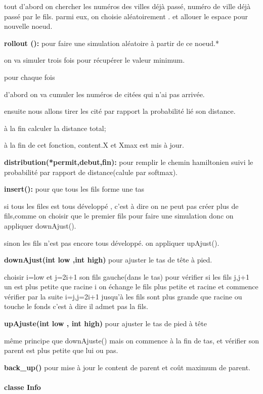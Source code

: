 \documentclass[]{article}
\let\oldparagraph\paragraph
\renewcommand{\paragraph}[1]{\oldparagraph{#1}\mbox{}}
\begin{document}
tout d'abord on chercher les numéros des villes déjà passé, numéro de
ville déjà passé par le fils. parmi eux, on choisie aléatoirement . et
allouer le espace pour nouvelle noeud.

\textbf{rollout (): }pour faire une simulation aléatoire à partir de ce
noeud.*

on va simuler trois fois pour récupérer le valeur minimum.

pour chaque fois

d'abord on va cumuler les numéros de citées qui n'ai pas arrivée.

ensuite nous allons tirer les cité par rapport la probabilité lié son
distance.

à la fin calculer la distance total;

à la fin de cet fonction, content.X et Xmax est mis à jour.

\textbf{distribution(*permit,debut,fin):} pour remplir le chemin
hamiltonien suivi le probabilité par rapport de distance(calule par
softmax).

\textbf{insert(): } pour que tous les fils forme une tas

si tous les files est tous développé , c'est à dire on ne peut pas créer
plus de fils,comme on choisir que le premier fils pour faire une
simulation donc on appliquer downAjust().

sinon les fils n'est pas encore tous développé. on appliquer upAjust().

\textbf{downAjust(int low ,int high)} pour ajuster le tas de tête à
pied.

choisir i=low et j=2i+1 son fils gauche(dans le tas) pour vérifier si
les fils j,j+1 un est plus petite que racine i on échange le fils plus
petite et racine et commence vérifier par la suite i=j,j=2i+1 jusqu'à
les fils sont plus grande que racine ou touche le fonds c'est à dire il
admet pas la fils.

\textbf{upAjuste(int low , int high) }pour ajuster le tas de pied à tête

même principe que downAjuste() mais on commence à la fin de tas, et
vérifier son parent est plus petite que lui ou pas.

\textbf{back\_up() }pour mise à jour le content de parent et coût
maximum de parent.

\hypertarget{classe-info}{%
\paragraph{classe Info }\label{classe-info}}
\end{document}
